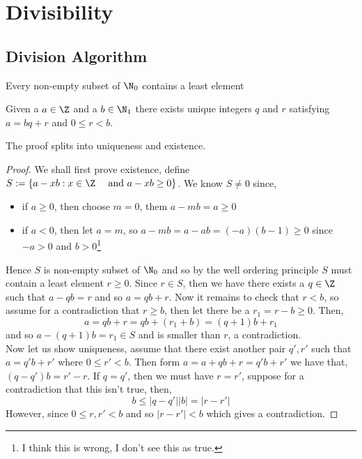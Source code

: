
\section{Divisibility}

\subsection{Division Algorithm}

\begin{ndefi}
  Every non-empty subset of $\N_0$ contains a least element
\end{ndefi}

\begin{nthm}
  Given a $a\in\Z$ and a $b\in\N_1$ there exists unique integers $q$ and $r$ satisfying $a = bq + r$ and $0\le r < b$.
\end{nthm}
The proof splits into uniqueness and existence.

\begin{proof}
  We shall first prove existence, define $S := \{a - xb : x \in \Z \quad \text{ and } a - xb \ge 0 \}$. We know $S \ne 0$ since,
  \begin{itemize}
    \item if $a \ge 0$, then choose $m = 0$, them $a - mb = a \ge 0$
    \item if $a < 0$, then let $a = m$, so $a - mb = a - ab = (-a)(b-1) \ge 0$ since $-a>0$ and $b > 0$\footnote{I think this is wrong, I don't see this as true.}
  \end{itemize}
  Hence $S$ is non-empty subset of $\N_0$ and so by the well ordering principle $S$ must contain a least element $r \ge 0$. Since $r \in S$, then we have there exists a $q \in\Z$ such that $a - qb = r$ and so $a = qb + r$. Now it remains to check that $r < b$, so assume for a contradiction that $r \ge b$, then let there be a $r_1 = r -b \ge 0$. Then,
  $$ a = qb + r = qb + (r_1 + b) = (q+1)b + r_1 $$
  and so $a - (q+1) b = r_1 \in S$ and is smaller than $r$, a contradiction.\\

  Now let us show uniqueness, assume that there exist another pair $q', r'$ such that $a = q'b+r'$ where $0 \le r' < b$. Then form $a = a + qb + r = q'b + r'$ we have that, $(q - q')b = r' - r$. If $q = q'$, then we must have $r = r'$, suppose for a contradiction that this isn't true, then,
  $$ b \le |q - q'||b| = |r - r'| $$
  However, since $0 \le r, r' < b$ and so $|r - r'| < b$ which gives a contradiction.
\end{proof}

